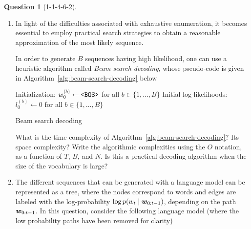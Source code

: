 \documentclass[12pt]{article}
\theoremstyle{definition}
\newtheorem{exercise}{Question}%
\begin{document}
\begin{exercise}[1-1-4-6-2]
\begin{enumerate}[label=\arabic{exercise}.\arabic*]
        \item In light of the difficulties associated with exhaustive enumeration, it becomes essential to employ practical search strategies to obtain a reasonable approximation of the most likely sequence.
        
        In order to generate $B$ sequences having high likelihood, one can use a heuristic algorithm called \emph{Beam search decoding}, whose pseudo-code is given in Algorithm~\ref{alg:beam-search-decoding} below
    
        \begin{minipage}{\linewidth}
        \begin{algorithm}[H]
        \DontPrintSemicolon
        Initialization: $w_{0}^{(b)} \leftarrow \textrm{\texttt{<BOS>}}$ for all $b \in \{1,\ldots,B\}$\;
        Initial log-likelihoods: $l_{0}^{(b)} \leftarrow 0$ for all $b \in \{1,\ldots,B\}$\;
        \caption{Beam search decoding}
        \label{alg:beam-search-decoding}
        \end{algorithm}
        \end{minipage}
        
        What is the time complexity of Algorithm~\ref{alg:beam-search-decoding}? Its space complexity? Write the algorithmic complexities using the $O$ notation, as a function of $T$, $B$, and $N$. Is this a practical decoding algorithm when the size of the vocabulary is large?
    
        
        \item The different sequences that can be generated with a language model can be represented as a tree, where the nodes correspond to words and edges are labeled with the log-probability $\log p(w_{t}\mid {\bm{w}}_{0:t-1})$, depending on the path ${\bm{w}}_{0:t-1}$. In this question, consider the following language model (where the low probability paths have been removed for clarity)
    

\end{enumerate}
\end{exercise}
\end{document}

